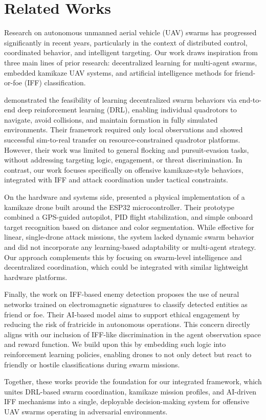 \section{Related Works}
    Research on autonomous unmanned aerial vehicle (UAV) swarms has progressed significantly in recent years, particularly in the context of distributed control, coordinated behavior, and intelligent targeting. Our work draws inspiration from three main lines of prior research: decentralized learning for multi-agent swarms, embedded kamikaze UAV systems, and artificial intelligence methods for friend-or-foe (IFF) classification.
    \medskip

    \cite{batra2022decentralized} demonstrated the feasibility of learning decentralized swarm behaviors via end-to-end deep reinforcement learning (DRL), enabling individual quadrotors to navigate, avoid collisions, and maintain formation in fully simulated environments. Their framework required only local observations and showed successful sim-to-real transfer on resource-constrained quadrotor platforms. However, their work was limited to general flocking and pursuit-evasion tasks, without addressing targeting logic, engagement, or threat discrimination. In contrast, our work focuses specifically on offensive kamikaze-style behaviors, integrated with IFF and attack coordination under tactical constraints.
    \medskip

    On the hardware and systems side, \cite{muda2024kamikaze} presented a physical implementation of a kamikaze drone built around the ESP32 microcontroller. Their prototype combined a GPS-guided autopilot, PID flight stabilization, and simple onboard target recognition based on distance and color segmentation. While effective for linear, single-drone attack missions, the system lacked dynamic swarm behavior and did not incorporate any learning-based adaptability or multi-agent strategy. Our approach complements this by focusing on swarm-level intelligence and decentralized coordination, which could be integrated with similar lightweight hardware platforms.
    \medskip

    Finally, the work \cite{rachman2024enemy} on IFF-based enemy detection proposes the use of neural networks trained on electromagnetic signatures to classify detected entities as friend or foe. Their AI-based model aims to support ethical engagement by reducing the risk of fratricide in autonomous operations. This concern directly aligns with our inclusion of IFF-like discrimination in the agent observation space and reward function. We build upon this by embedding such logic into reinforcement learning policies, enabling drones to not only detect but react to friendly or hostile classifications during swarm missions.
    \medskip

    Together, these works provide the foundation for our integrated framework, which unites DRL-based swarm coordination, kamikaze mission profiles, and AI-driven IFF mechanisms into a single, deployable decision-making system for offensive UAV swarms operating in adversarial environments.
